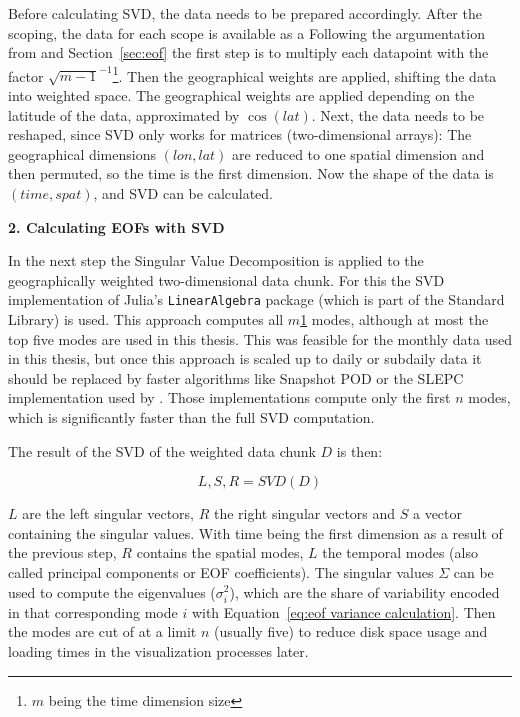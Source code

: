 Before calculating SVD, the data needs to be prepared accordingly. 
After the scoping, the data for each scope is available as a 
Following the argumentation from \cite{vietinghoffdiss} and Section~\ref{sec:eof} the first step is to multiply each datapoint with the factor $\sqrt{m-1}^{-1}$\footnote{\label{timesize}$m$ being the time dimension size}. 
Then the geographical weights are applied, shifting the data into weighted space. 
The geographical weights are applied depending on the latitude of the data, approximated by $\cos(lat)$. 
Next, the data needs to be reshaped, since SVD only works for matrices (two-dimensional arrays): The geographical dimensions $(lon, lat)$ are reduced to one spatial dimension and then permuted, so the time is the first dimension. 
Now the shape of the data is $(time, spat)$, and SVD can be calculated. 

\textbf{2. Calculating EOFs with SVD}

In the next step the Singular Value Decomposition is applied to the geographically weighted two-dimensional data chunk. 
For this the SVD implementation of Julia's \texttt{Linear\-Algebra} package (which is part of the Standard Library) is used.
This approach computes all $m$\cref{timesize} modes, although at most the top five modes are used in this thesis. 
This was feasible for the monthly data used in this thesis, but once this approach is scaled up to daily or subdaily data it should be replaced by faster algorithms like Snapshot POD or the SLEPC implementation used by \citeauthor{vietinghoffdiss} \cite{vietinghoffdiss}.
Those implementations compute only the first $n$ modes, which is significantly faster than the full SVD computation. 

The result of the SVD of the weighted data chunk $D$ is then:

\begin{equation}
\label{eq:SVD}
L,S,R = SVD(D)
\end{equation}

$L$ are the left singular vectors, $R$ the right singular vectors and $S$ a vector containing the singular values. 
With time being the first dimension as a result of the previous step, $R$ contains the spatial modes, $L$ the temporal modes (also called principal components or EOF coefficients). 
The singular values $\Sigma$ can be used to compute the eigenvalues ($\sigma_i^2$), which are  the share of variability encoded in that corresponding mode $i$ with Equation~\ref{eq:eof variance calculation}. 
Then the modes are cut of at a limit $n$ (usually five) to reduce disk space usage and loading times in the visualization processes later. 


